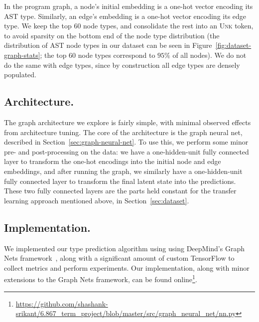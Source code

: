 In the program graph, a node's initial embedding is a one-hot vector encoding its AST type.
Similarly, an edge's embedding is a one-hot vector encoding its edge type.
We keep the top 60 node types, and consolidate the rest into an \textsc{Unk} token, to avoid sparsity on the bottom end of the node type distribution (the distribution of AST node types in our dataset can be seen in Figure~\ref{fig:dataset-graph-stats}; the top 60 node types correspond to $95\%$ of all nodes).
We do not do the same with edge types, since by construction all edge types are densely populated.

\subsection{Architecture.}

The graph architecture we explore is fairly simple, with minimal observed effects from architecture tuning.
The core of the architecture is the graph neural net, described in Section~\ref{sec:graph-neural-net}.
To use this, we perform some minor pre- and post-processing on the data: we have a one-hidden-unit fully connected layer to transform the one-hot encodings into the initial node and edge embeddings, and after running the graph, we similarly have a one-hidden-unit fully connected layer to transform the final latent state into the predictions.
These two fully connected layers are the parts held constant for the transfer learning approach mentioned above, in Section~\ref{sec:dataset}.

\subsection{Implementation.}

We implemented our type prediction algorithm using using DeepMind's Graph Nets framework~\cite{deepmind2018graph}, along with a significant amount of custom TensorFlow to collect metrics and perform experiments.
Our implementation, along with minor extensions to the Graph Nets framework, can be found online\footnote{\url{https://github.com/shashank-srikant/6.867_term_project/blob/master/src/graph_neural_net/nn.py}}.